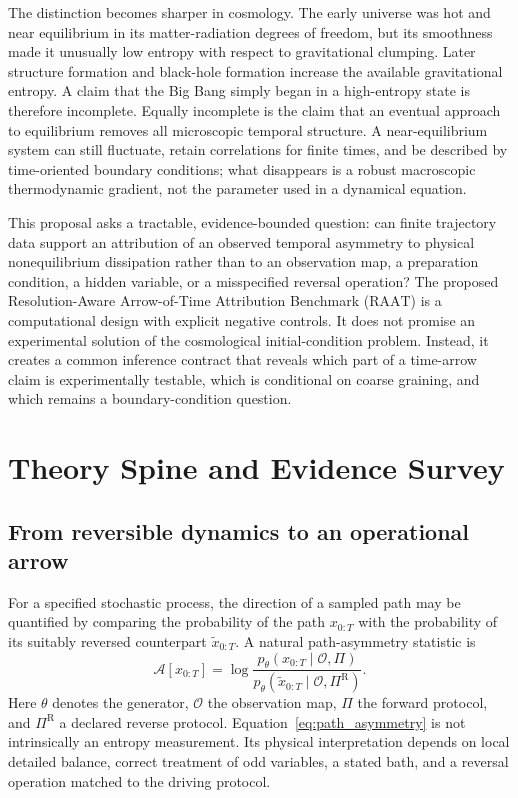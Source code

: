 \documentclass[conference]{../../../../Conference-LaTeX-template_10-17-19/IEEEtran}
\newcommand{\RAAT}{\ensuremath{\mathrm{RAAT}}}
\begin{document}
The distinction becomes sharper in cosmology. The early universe was hot and near equilibrium in its matter-radiation degrees of freedom, but its smoothness made it unusually low entropy with respect to gravitational clumping. Later structure formation and black-hole formation increase the available gravitational entropy. A claim that the Big Bang simply began in a high-entropy state is therefore incomplete. Equally incomplete is the claim that an eventual approach to equilibrium removes all microscopic temporal structure. A near-equilibrium system can still fluctuate, retain correlations for finite times, and be described by time-oriented boundary conditions; what disappears is a robust macroscopic thermodynamic gradient, not the parameter used in a dynamical equation.

This proposal asks a tractable, evidence-bounded question: can finite trajectory data support an attribution of an observed temporal asymmetry to physical nonequilibrium dissipation rather than to an observation map, a preparation condition, a hidden variable, or a misspecified reversal operation? The proposed Resolution-Aware Arrow-of-Time Attribution Benchmark (\RAAT) is a computational design with explicit negative controls. It does not promise an experimental solution of the cosmological initial-condition problem. Instead, it creates a common inference contract that reveals which part of a time-arrow claim is experimentally testable, which is conditional on coarse graining, and which remains a boundary-condition question.

\section{Theory Spine and Evidence Survey}

\subsection{From reversible dynamics to an operational arrow}

For a specified stochastic process, the direction of a sampled path may be quantified by comparing the probability of the path $x_{0:T}$ with the probability of its suitably reversed counterpart $\tilde{x}_{0:T}$. A natural path-asymmetry statistic is
\begin{equation}
\mathcal{A}[x_{0:T}]=\log\frac{p_{\theta}(x_{0:T}\mid\mathcal{O},\Pi)}{p_{\theta}(\tilde{x}_{0:T}\mid\mathcal{O},\Pi^{\mathrm{R}})}.
\label{eq:path_asymmetry}
\end{equation}
Here $\theta$ denotes the generator, $\mathcal{O}$ the observation map, $\Pi$ the forward protocol, and $\Pi^{\mathrm{R}}$ a declared reverse protocol. Equation~\eqref{eq:path_asymmetry} is not intrinsically an entropy measurement. Its physical interpretation depends on local detailed balance, correct treatment of odd variables, a stated bath, and a reversal operation matched to the driving protocol.
\end{document}

